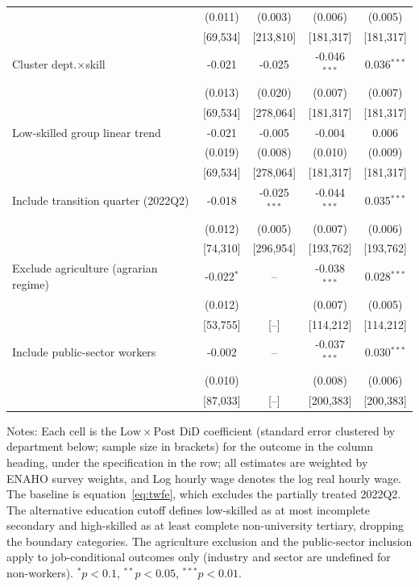\begin{table}[!tbp]
\begin{threeparttable}
\begin{tabular}{lcccc}
 & (0.011) & (0.003) & (0.006) & (0.005) \\
 & \footnotesize[69,534] & \footnotesize[213,810] & \footnotesize[181,317] & \footnotesize[181,317] \\
Cluster dept.$\times$skill & -0.021 & -0.025 & -0.046$^{***}$ & 0.036$^{***}$ \\
 & (0.013) & (0.020) & (0.007) & (0.007) \\
 & \footnotesize[69,534] & \footnotesize[278,064] & \footnotesize[181,317] & \footnotesize[181,317] \\
Low-skilled group linear trend & -0.021 & -0.005 & -0.004 & 0.006 \\
 & (0.019) & (0.008) & (0.010) & (0.009) \\
 & \footnotesize[69,534] & \footnotesize[278,064] & \footnotesize[181,317] & \footnotesize[181,317] \\
Include transition quarter (2022Q2) & -0.018 & -0.025$^{***}$ & -0.044$^{***}$ & 0.035$^{***}$ \\
 & (0.012) & (0.005) & (0.007) & (0.006) \\
 & \footnotesize[74,310] & \footnotesize[296,954] & \footnotesize[193,762] & \footnotesize[193,762] \\
Exclude agriculture (agrarian regime) & -0.022$^{*}$ & -- & -0.038$^{***}$ & 0.028$^{***}$ \\
 & (0.012) &  & (0.007) & (0.005) \\
 & \footnotesize[53,755] & \footnotesize[--] & \footnotesize[114,212] & \footnotesize[114,212] \\
Include public-sector workers & -0.002 & -- & -0.037$^{***}$ & 0.030$^{***}$ \\
 & (0.010) &  & (0.008) & (0.006) \\
 & \footnotesize[87,033] & \footnotesize[--] & \footnotesize[200,383] & \footnotesize[200,383] \\
\bottomrule
\end{tabular}
\begin{tablenotes}\footnotesize
\item Notes: Each cell is the $\mathrm{Low}\times\mathrm{Post}$ DiD coefficient (standard error clustered by department below; sample size in brackets) for the outcome in the column heading, under the specification in the row; all estimates are weighted by ENAHO survey weights, and Log hourly wage denotes the log real hourly wage. The baseline is equation~\eqref{eq:twfe}, which excludes the partially treated 2022Q2. The alternative education cutoff defines low-skilled as at most incomplete secondary and high-skilled as at least complete non-university tertiary, dropping the boundary categories. The agriculture exclusion and the public-sector inclusion apply to job-conditional outcomes only (industry and sector are undefined for non-workers). $^{*}p<0.1$, $^{**}p<0.05$, $^{***}p<0.01$.
\end{tablenotes}
\end{threeparttable}\end{table}
